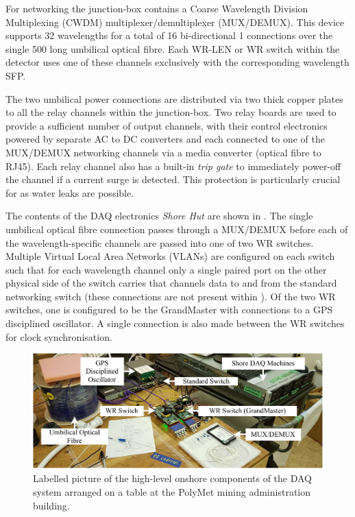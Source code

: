 For networking the junction-box contains a Coarse Wavelength Division Multiplexing (CWDM)
multiplexer/demultiplexer (MUX/DEMUX). This device supports 32 wavelengths for a total of 16
bi-directional \SI{1}{} connections over the single \SI{500}{} long umbilical
optical fibre. Each WR-LEN or WR switch within the detector uses one of these channels exclusively
with the corresponding wavelength SFP.

The two umbilical power connections are distributed via two thick copper plates to all the relay
channels within the junction-box. Two relay boards are used to provide a sufficient number of
output channels, with their control electronics powered by separate AC to DC converters and each
connected to one of the MUX/DEMUX networking channels via a media converter (optical fibre to
RJ45). Each relay channel also has a built-in \emph{trip gate} to immediately power-off the
channel if a current surge is detected. This protection is particularly crucial for \chipsfive as
water leaks are possible.

The contents of the DAQ electronics \emph{Shore Hut} are shown in . The
single umbilical optical fibre connection passes through a MUX/DEMUX before each of the
wavelength-specific channels are passed into one of two WR switches. Multiple Virtual Local Area
Networks (VLANs) are configured on each switch such that for each wavelength channel only a single
paired port on the other physical side of the switch carries that channels data to and from the
standard networking switch (these connections are not present within ). Of
the two WR switches, one is configured to be the GrandMaster with connections to a GPS disciplined
oscillator. A single connection is also made between the WR switches for clock synchronisation.

\begin{figure} %
    \includegraphics[width=\textwidth]{diagrams/5-daq/hut_daq.pdf}
    \caption[Labelled picture of the high-level onshore components of the \chipsfive DAQ system]
    {Labelled picture of the high-level onshore components of the \chipsfive DAQ system arranged
        on a table at the PolyMet mining administration building.}
    \label{fig:hut_daq}
\end{figure}

